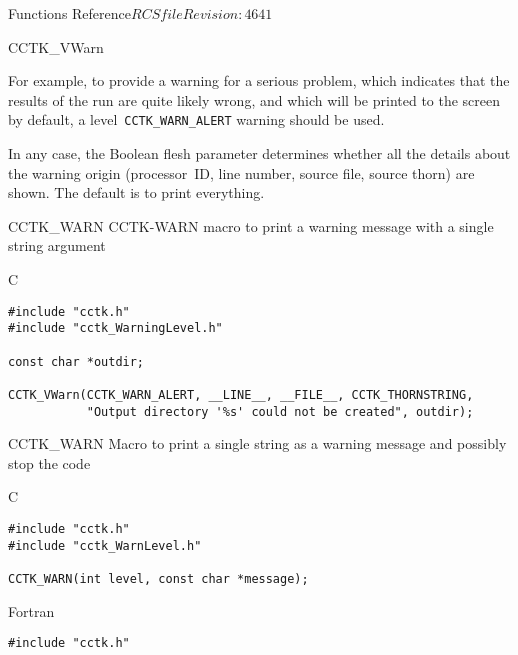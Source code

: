 \begin{cactuspart}{ Functions Reference}{$RCSfile$}{$Revision: 4641 $}
\begin{FunctionDescription}{CCTK\_VWarn}
\begin{Discussion}
For example, to provide a warning for a serious problem, which
indicates that the results of the run are quite likely wrong,
and which will be printed to the screen by default,
a level~\verb|CCTK_WARN_ALERT| warning should be used.

In any case, the Boolean flesh parameter 
determines whether all the details about the warning origin (processor~ID,
line number, source file, source thorn) are shown. The default is to
print everything.
\end{Discussion}

\begin{SeeAlsoSection}
\begin{SeeAlso2} {CCTK\_WARN} {CCTK-WARN}
macro to print a warning message with a single string argument
\end{SeeAlso2}
\end{SeeAlsoSection}

\begin{ExampleSection}
\begin{Example}{C}
\begin{verbatim}
#include "cctk.h"
#include "cctk_WarningLevel.h"

const char *outdir;

CCTK_VWarn(CCTK_WARN_ALERT, __LINE__, __FILE__, CCTK_THORNSTRING,
           "Output directory '%s' could not be created", outdir);
\end{verbatim}
\end{Example}
\end{ExampleSection}
\end{FunctionDescription}






\begin{FunctionDescription}{CCTK\_WARN}
\label{CCTK-WARN}
Macro to print a single string as a warning message and possibly stop the code

\begin{SynopsisSection}
\begin{Synopsis}{C}
\begin{verbatim}
#include "cctk.h"
#include "cctk_WarnLevel.h"

CCTK_WARN(int level, const char *message);
\end{verbatim}
\end{Synopsis}
\begin{Synopsis}{Fortran}
\begin{verbatim}
#include "cctk.h"


\end{verbatim}
\end{Synopsis}
\end{SynopsisSection}
\end{FunctionDescription}
\end{cactuspart}
